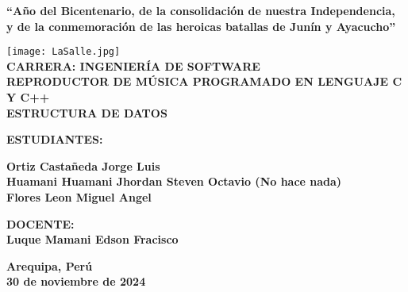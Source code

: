 \documentclass[corference]{IEEEtran}
\begin{document}
\sloppy
\setlength{\columnsep}{16pt} %
\begin{titlepage}   
    
    \begin{center}
        \fontsize{12}{14}\selectfont %
        \textbf{“Año del Bicentenario, de la consolidación de nuestra Independencia, \\
        y de la conmemoración de las heroicas batallas de Junín y Ayacucho”}
        
        \texttt{[image: LaSalle.jpg]}\\
    
        
        \textbf{CARRERA: INGENIERÍA DE SOFTWARE} \\
        \textbf{REPRODUCTOR DE MÚSICA PROGRAMADO EN LENGUAJE C Y C++} \\
        \textbf{ESTRUCTURA DE DATOS} \\
        
        \vspace{1cm}
        
        \textbf{ESTUDIANTES:} \\
        
        \vspace{1cm}
        
        \textbf{Ortiz Castañeda Jorge Luis} \\
        \textbf{Huamani Huamani Jhordan Steven Octavio (No hace nada)} \\
        \textbf{Flores Leon Miguel Angel} \\

        \vspace{1cm}
        
        \textbf{DOCENTE:} \\
        \textbf{Luque Mamani Edson Fracisco} \\

        \vspace{1cm}
        
        \textbf{Arequipa, Perú} \\
        \textbf{30 de noviembre de 2024}
    \end{center}
    \end{titlepage}
    \newpage
    \newpage
    
\end{document}
